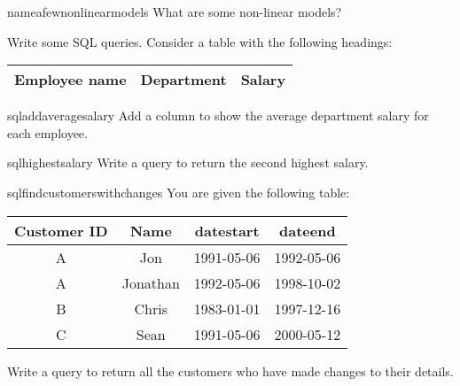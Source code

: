 \documentclass[a4paper]{article}
\begin{document}
\begin{question}{nameafewnonlinearmodels}
What are some non-linear models?
\end{question}


\begin{questionwithnoanswer}
Write some SQL queries.
Consider a table with the following headings:
\begin{center}
\begin{tabular}{|c|c|c|}
\hline
   Employee name & Department & Salary \\
\hline
\end{tabular}
\end{center}
\end{questionwithnoanswer}

\begin{subquestion}{sqladdaveragesalary}
Add a column to show the average department salary for each employee.
\end{subquestion}


\begin{subquestion}{sqlhighestsalary}
Write a query to return the second highest salary.
\end{subquestion}



\begin{question}{sqlfindcustomerswithchanges}
You are given the following table:
\begin{center}
\begin{tabular}{|c|c|c|c|}
\hline
     Customer ID    &   Name     &  datestart     & dateend     \\
\hline
     A              &   Jon      &  1991-05-06    & 1992-05-06  \\
     A              &   Jonathan &  1992-05-06    & 1998-10-02  \\
     B              &   Chris    &  1983-01-01    & 1997-12-16  \\
     C              &   Sean     &  1991-05-06    & 2000-05-12  \\
\hline
\end{tabular}
\end{center}
Write a query to return all the customers who have made changes to their details.
\end{question}

\clearpage





\end{document}
